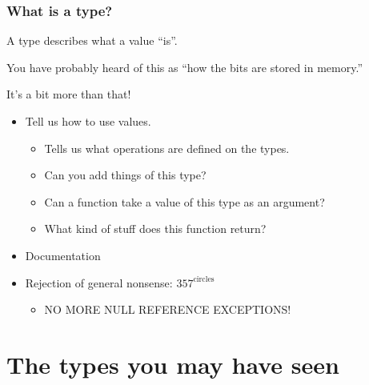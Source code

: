 \documentclass{beamer}
\begin{document}
\begin{frame}
  \frametitle{What is a type?}

  A type describes what a value ``is''.

  \pause

  You have probably heard of this as ``how the bits are stored in memory.''

  \pause

  It's a bit more than that!

  \pause

  \begin{itemize}
  \item Tell us how to use values.
    \begin{itemize}
    \item Tells us what operations are defined on the types.
    \item Can you add things of this type?
    \item Can a function take a value of this type as an argument?
    \item What kind of stuff does this function return?
    \end{itemize}

  \pause

  \item Documentation

  \pause

  \item Rejection of general nonsense: \(357^\text{circles}\)

  \pause

  \begin{itemize}
  \item \huge{NO MORE NULL REFERENCE EXCEPTIONS!}
  \end{itemize}
  \end{itemize}
\end{frame}

\section{The types you may have seen}
\end{document}
